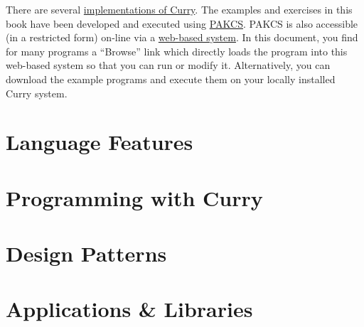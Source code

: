 \documentclass[11pt,fleqn]{report}
\newcommand{\curryurl}{http://www.curry-language.org}
\newcommand{\pakcs}%
  {\href{http://www.informatik.uni-kiel.de/~pakcs}{{\sc PAKCS}}}
\begin{document}
There are several
\href{\curryurl/implementations/overview}{implementations of Curry}.
The examples and exercises in this book have been developed
and executed using \pakcs.
PAKCS is also accessible (in a restricted form) on-line via a
\href{http://www-ps.informatik.uni-kiel.de/smap/}{web-based system}.
In this document, you find for many programs a ``Browse'' link
which directly loads the program into this web-based system so that
you can run or modify it.
Alternatively, you can download the example programs
and execute them on your locally installed Curry system.



\part{Language Features}




\part{Programming with Curry}

\part{Design Patterns}


\part{Applications \& Libraries}



\newpage
{}



\newpage
{}
\printindex
\end{document}

